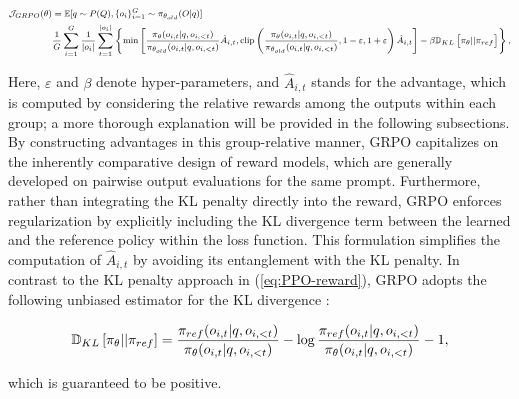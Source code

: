 \begin{itemize}[topsep=0pt]
\begin{itemize}[topsep=0pt]
\begin{equation}
\footnotesize
\begin{split}
    \mathcal{J}_{GRPO}(\theta) &= \mathbb{E}{[q \sim P(Q), \{o_i\}_{i=1}^G \sim \pi_{\theta_{old}}(O|q)]}  \\
    & \frac{1}{G}\sum_{i=1}^G\frac{1}{|o_i|} \sum_{t=1}^{|o_i|} \left\{ \min \left[ \frac{\pi_\theta(o_{i,t} | q, o_{i,<t})}{\pi_{\theta_{old}}(o_{i,t} | q, o_{i,<t})} \hat{A}_{i,t}, \text{clip} \left( \frac{\pi_\theta(o_{i,t} | q, o_{i,<t})}{\pi_{\theta_{old}}(o_{i,t} | q, o_{i,<t})}, 1 - \varepsilon, 1 + \varepsilon \right)  \hat{A}_{i,t} \right] - \beta \mathbb{D}_{KL}\left[\pi_{\theta} || \pi_{ref}\right]\right\} ,
\end{split}
\label{eq:GRPO-obj}
\end{equation}

Here, $\varepsilon$ and $\beta$ denote hyper-parameters, and $\hat{A}_{i,t}$ stands for the advantage, which is computed by considering the relative rewards among the outputs within each group; a more thorough explanation will be provided in the following subsections. By constructing advantages in this group-relative manner, GRPO capitalizes on the inherently comparative design of reward models, which are generally developed on pairwise output evaluations for the same prompt. Furthermore, rather than integrating the KL penalty directly into the reward, GRPO enforces regularization by explicitly including the KL divergence term between the learned and the reference policy within the loss function. This formulation simplifies the computation of $\hat{A}_{i,t}$ by avoiding its entanglement with the KL penalty. In contrast to the KL penalty approach in (\ref{eq:PPO-reward}), GRPO adopts the following unbiased estimator for the KL divergence \citep{kl_approx}:

\begin{equation}
\small
    \mathbb{D}_{KL}\left[\pi_{\theta} || \pi_{ref}\right] = \frac{\pi_{ref}(o_{i,t}|q,o_{i,<t})}{\pi_{\theta}(o_{i,t}|q,o_{i,<t})}- \log\frac{\pi_{ref}(o_{i,t}|q,o_{i,<t})}{\pi_{\theta}(o_{i,t}|q,o_{i,<t})} - 1,
\end{equation}

which is guaranteed to be positive.


\end{itemize}
\end{itemize}
